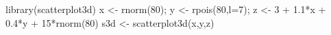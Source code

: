 \begin{Schunk}
\begin{Sinput}
 library(scatterplot3d)
 x <- rnorm(80); y <- rpois(80,l=7); z <- 3 + 1.1*x + 0.4*y + 15*rnorm(80)
 s3d <- scatterplot3d(x,y,z)
\end{Sinput}
\end{Schunk}
